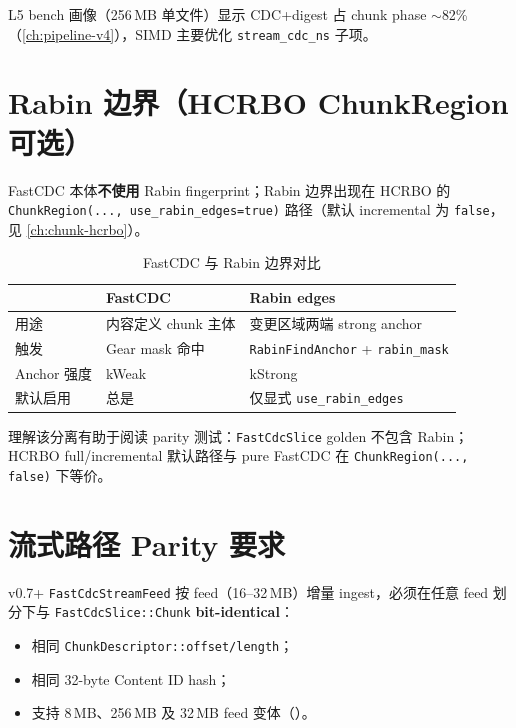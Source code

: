 L5 bench 画像（256\,MB 单文件）显示 CDC+digest 占 chunk phase $\sim$82\%（\cref{ch:pipeline-v4}），SIMD 主要优化 \texttt{stream\_cdc\_ns} 子项。

\section{Rabin 边界（HCRBO ChunkRegion 可选）}
\label{sec:rabin-edges}

FastCDC 本体\textbf{不使用} Rabin fingerprint；Rabin 边界出现在 HCRBO 的 \texttt{ChunkRegion(..., use\_rabin\_edges=true)} 路径（默认 incremental 为 \texttt{false}，见 \cref{ch:chunk-hcrbo}）。

\begin{table}[htbp]
\centering
\caption{FastCDC 与 Rabin 边界对比}
\label{tab:fastcdc-vs-rabin}
\begin{tabular}{@{}llp{6.5cm}@{}}
\toprule
 & FastCDC & Rabin edges \\
\midrule
用途 & 内容定义 chunk 主体 & 变更区域两端 strong anchor \\
触发 & Gear mask 命中 & \texttt{RabinFindAnchor} + \texttt{rabin\_mask} \\
Anchor 强度 & kWeak & kStrong \\
默认启用 & 总是 & 仅显式 \texttt{use\_rabin\_edges} \\
\bottomrule
\end{tabular}
\end{table}

理解该分离有助于阅读 parity 测试：\texttt{FastCdcSlice} golden 不包含 Rabin；HCRBO full/incremental 默认路径与 pure FastCDC 在 \texttt{ChunkRegion(..., false)} 下等价。

\section{流式路径 Parity 要求}
\label{sec:streaming-parity}

v0.7+ \texttt{FastCdcStreamFeed} 按 feed（16--32\,MB）增量 ingest，必须在任意 feed 划分下与 \texttt{FastCdcSlice::Chunk} \textbf{bit-identical}：

\begin{itemize}[nosep]
  \item 相同 \texttt{ChunkDescriptor::offset/length}；
  \item 相同 32-byte Content ID hash；
  \item 支持 8\,MB、256\,MB 及 32\,MB feed 变体（）。
\end{itemize}

